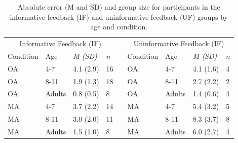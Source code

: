 \documentclass[a4paper,man,natbib,floatsintext,noextraspace]{apa6}
\begin{document}
\begin{table}[htb]
\caption{Absolute error (M and SD) and group size for participants in the informative feedback (IF) and uninformative feedback (UF) groups by age and condition.}
\label{tab:1}
\begin{tabular}{@{}lllllllll@{}}
\multicolumn{4}{c}{Informative Feedback (IF)}                                                                                    &                       & \multicolumn{4}{c}{Uninformative Feedback (IF)}                                                                  \\ 
\multicolumn{1}{l}{Condition} & \multicolumn{1}{l}{Age} & \multicolumn{1}{l}{\textit{M (SD)}} & \multicolumn{1}{l}{\textit{n}} & \multicolumn{1}{l}{} & \multicolumn{1}{l}{Condition} & \multicolumn{1}{l}{Age} & \multicolumn{1}{l}{\textit{M (SD)}} & \multicolumn{1}{l}{$n$} \\ \midrule
OA                              & 4-7                      & 4.1 (2.9)                            & 16                              &                       & OA                             & 4-7                      & 4.1 (1.6)                   & 4                      \\
OA                              & 8-11                     & 1.9 (1.3)                            & 18                              &                       & OA                             & 8-11                     & 2.7 (2.2)                   & 2                      \\
OA                              & Adults                   & 0.8 (0.5)                            & 8                               &                       & OA                             & Adults                   & 1.4 (0.6)                   & 4                      \\
MA                              & 4-7                      & 3.7 (2.2)                            & 14                              &                       & MA                             & 4-7                      & 5.4 (3.2)                   & 5                      \\
MA                              & 8-11                     & 3.0 (2.0)                            & 11                              &                       & MA                             & 8-11                     & 8.3 (3.7)                   & 8                      \\
MA                              & Adults                   & 1.5 (1.0)                            & 8                               &                       & MA                             & Adults                   & 6.0 (2.7)                   & 4                      \\ \bottomrule
\end{tabular}
\end{table}
\end{document}
